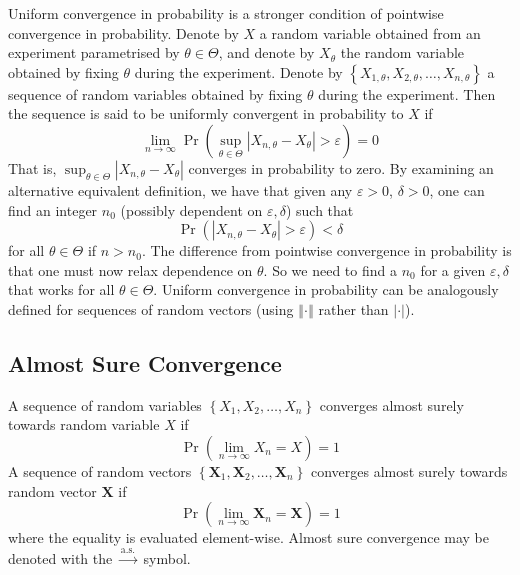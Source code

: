 \documentclass[11pt]{report} %
\begin{document}
Uniform convergence in probability is a stronger condition of pointwise convergence in probability. Denote by $X$ a random variable obtained from an experiment parametrised by $\theta\in\Theta$, and denote by $X_{\theta}$ the random variable obtained by fixing $\theta$ during the experiment. Denote by $\left\{X_{1, \theta}, X_{2, \theta}, \dots, X_{n, \theta}\right\}$ a sequence of random variables obtained by fixing $\theta$ during the experiment. Then the sequence is said to be uniformly convergent in probability to $X$ if
\begin{equation}
\lim_{n\to \infty}\operatorname{Pr}\left(\sup_{\theta\in\Theta}\left|X_{n, \theta} - X_{\theta}\right| > \varepsilon\right) = 0
\end{equation}
That is, $\sup_{\theta\in\Theta}\left|X_{n, \theta} - X_{\theta}\right|$ converges in probability to zero. By examining an alternative equivalent definition, we have that given any $\varepsilon > 0$, $\delta > 0$, one can find an integer $n_{0}$ (possibly dependent on $\varepsilon, \delta$) such that 
\begin{equation}
\operatorname{Pr}\left(\left|X_{n, \theta} - X_{\theta}\right| > \varepsilon\right) < \delta
\end{equation}
for all $\theta\in\Theta$ if $n > n_{0}$. The difference from pointwise convergence in probability is that one must now relax dependence on $\theta$. So we need to find a $n_{0}$ for a given $\varepsilon, \delta$ that works for all $\theta\in\Theta$. Uniform convergence in probability can be analogously defined for sequences of random vectors (using $\left\Vert\cdot\right\Vert$ rather than $\left|\cdot\right|$).

\subsection{Almost Sure Convergence}

A sequence of random variables $\left\{X_{1}, X_{2}, \dots, X_{n} \right\}$ converges almost surely towards random variable $X$ if
\begin{equation}
\operatorname{Pr}\left(\lim_{n\to\infty}X_{n} = X\right) = 1
\end{equation}
A sequence of random vectors $\left\{\mathbf{X}_{1}, \mathbf{X}_{2}, \dots, \mathbf{X}_{n} \right\}$ converges almost surely towards random vector $\mathbf{X}$ if
\begin{equation}
\operatorname{Pr}\left(\lim_{n\to\infty}\mathbf{X}_{n} = \mathbf{X}\right) = 1
\end{equation}
where the equality is evaluated element-wise. Almost sure convergence may be denoted with the $\overset{\mathrm{a.s.}}\to$ symbol.\\
\end{document}

